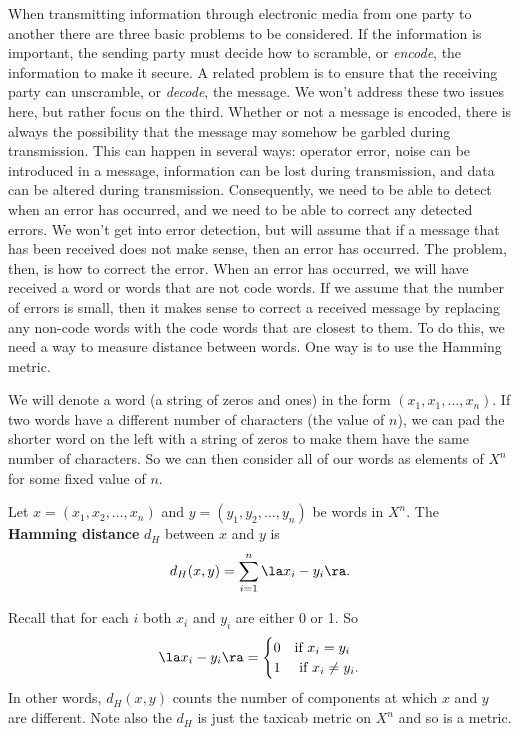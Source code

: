 When transmitting information through electronic media from one party to another there are three basic problems to be considered. If the information is important, the sending party must decide how to scramble, or \emph{encode}, the information to make it secure. A related problem is to ensure that the receiving party can unscramble, or \emph{decode}, the message. We won't address these two issues here, but rather focus on the third. Whether or not a message is encoded, there is always the possibility that the message may somehow be garbled during transmission. This can happen in several ways: operator error, noise can be introduced in a message, information can be lost during transmission, and data can be altered during transmission. Consequently, we need to be able to detect when an error has occurred, and we need to be able to correct any detected errors. We won't get into error detection, but will assume that if a message that has been received does not make sense, then an error has occurred. The problem, then, is how to correct the error. When an error has occurred, we will have received a word or words that are not code words. If we assume that the number of errors is small, then it makes sense to correct a received message by replacing any non-code words with the code words that are closest to them. To do this, we need a way to measure distance between words. One way is to use the Hamming metric. 

We will denote a word (a string of zeros and ones) in the form $(x_1, x_1, \ldots, x_n)$. If two words have a different number of characters (the value of $n$), we can pad the shorter word on the left with a string of zeros to make them have the same number of characters. So we can then consider all of our words as elements of $X^n$ for some fixed value of $n$. 



\begin{definition} Let $x = (x_1, x_2, \ldots, x_n)$ and $y = (y_1, y_2, \ldots, y_n)$ be words in $X^n$. The \textbf{Hamming distance} $d_H$ between $x$ and $y$ is 
\[d_H(x,y) = \sum_{i=1}^n \la x_i-y_i \ra.\]
\end{definition}



Recall that for each $i$ both $x_i$ and $y_i$ are either 0 or 1. So 
\[\la x_i-y_i \ra = \begin{cases} 0 &\text{if } x_i=y_i \\ 1 &\text{ if } x_i \neq y_i. \end{cases}\]
In other words, $d_H(x,y)$ counts the number of components at which $x$ and $y$ are different. Note also the $d_H$ is just the taxicab metric on $X^n$ and so is a metric. 



